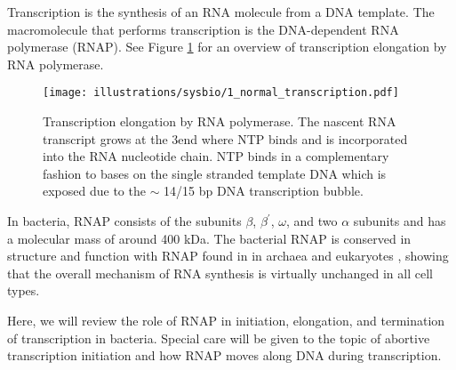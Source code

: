 %
Transcription is the synthesis of an RNA molecule from a DNA template. The
macromolecule that performs transcription is the DNA-dependent RNA polymerase
(RNAP). See Figure \ref{fig:transcription_elongation} for an overview of
transcription elongation by RNA polymerase.

\begin{figure}[htb]
    \begin{center}
        \texttt{[image: illustrations/sysbio/1\_normal\_transcription.pdf]}
    \end{center}
    \caption{Transcription elongation by RNA polymerase. The nascent RNA
    transcript grows at the 3\protect\ppp end where NTP binds and is
    incorporated into the RNA nucleotide chain. NTP binds in a complementary
    fashion to bases on the single stranded template DNA which is exposed due
    to the $\sim$ 14/15 bp DNA transcription bubble.}
    \label{fig:transcription_elongation}
\end{figure}

In bacteria, RNAP consists of the subunits $\beta$, $\beta^{\prime}$, $\omega$,
and two $\alpha$ subunits and has a molecular mass of around 400 kDa. The
bacterial RNAP is conserved in structure and function with RNAP found in in
archaea and eukaryotes \cite{borukhov_rna_2008}, showing that the overall
mechanism of RNA synthesis is virtually unchanged in all cell types.

Here, we will review the role of RNAP in initiation, elongation, and
termination of transcription in bacteria. Special care will be given to the
topic of abortive transcription initiation and how RNAP moves along DNA during
transcription.

